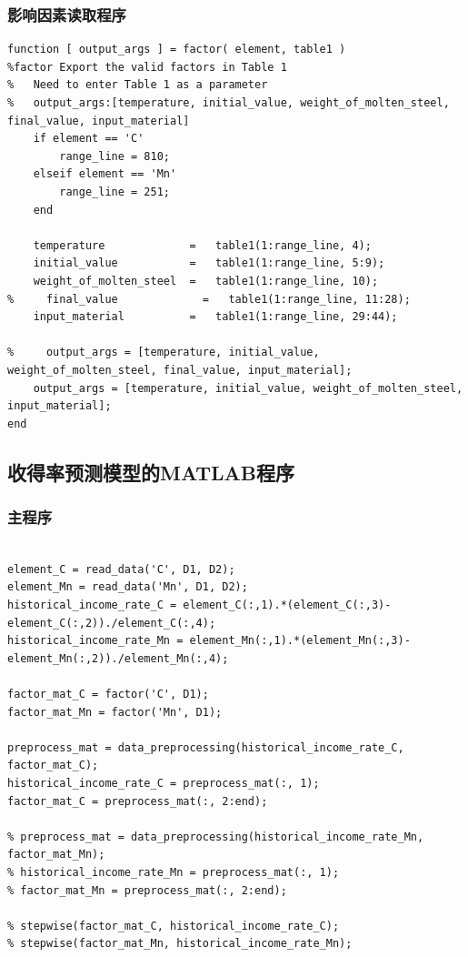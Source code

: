 \documentclass[12pt]{article}%
\begin{document}
\subsubsection{影响因素读取程序}
\begin{lstlisting}
function [ output_args ] = factor( element, table1 )
%factor Export the valid factors in Table 1
%   Need to enter Table 1 as a parameter
%   output_args:[temperature, initial_value, weight_of_molten_steel, final_value, input_material]
    if element == 'C'
        range_line = 810;
    elseif element == 'Mn'
        range_line = 251;
    end

    temperature             =   table1(1:range_line, 4);
    initial_value           =   table1(1:range_line, 5:9);
    weight_of_molten_steel  =   table1(1:range_line, 10);
%     final_value             =   table1(1:range_line, 11:28);
    input_material          =   table1(1:range_line, 29:44);

%     output_args = [temperature, initial_value, weight_of_molten_steel, final_value, input_material];
    output_args = [temperature, initial_value, weight_of_molten_steel, input_material];
end
 \end{lstlisting}
 \subsection{收得率预测模型的MATLAB程序}
 \subsubsection{主程序}
 \begin{lstlisting}

element_C = read_data('C', D1, D2);
element_Mn = read_data('Mn', D1, D2);
historical_income_rate_C = element_C(:,1).*(element_C(:,3)-element_C(:,2))./element_C(:,4);
historical_income_rate_Mn = element_Mn(:,1).*(element_Mn(:,3)-element_Mn(:,2))./element_Mn(:,4);

factor_mat_C = factor('C', D1);
factor_mat_Mn = factor('Mn', D1);

preprocess_mat = data_preprocessing(historical_income_rate_C, factor_mat_C);
historical_income_rate_C = preprocess_mat(:, 1);
factor_mat_C = preprocess_mat(:, 2:end);

% preprocess_mat = data_preprocessing(historical_income_rate_Mn, factor_mat_Mn);
% historical_income_rate_Mn = preprocess_mat(:, 1);
% factor_mat_Mn = preprocess_mat(:, 2:end);

% stepwise(factor_mat_C, historical_income_rate_C);
% stepwise(factor_mat_Mn, historical_income_rate_Mn);
 \end{lstlisting}
\end{document}
